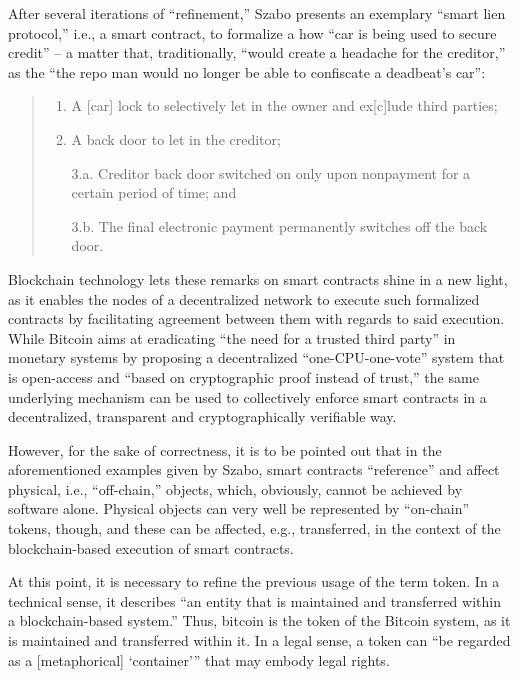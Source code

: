 After several iterations of ``refinement,'' Szabo presents an exemplary ``smart lien protocol,'' i.e., a smart contract, to formalize a how ``car is being used to secure credit'' -- a matter that, traditionally, ``would create a headache for the creditor,'' as the ``the repo man would no longer be able to confiscate a deadbeat's car'': \autocite{uva1997smartcontracts}

\begin{quote}
	\begin{enumerate}
		\item
			A [car] lock to selectively let in the owner and ex[c]lude third parties;
		\item
			A back door to let in the creditor;
		\item[3.a.]
			Creditor back door switched on only upon nonpayment for a certain period of time; and
		\item[3.b.]
			The final electronic payment permanently switches off the back door.
	\end{enumerate}
\end{quote}

Blockchain technology lets these remarks on smart contracts shine in a new light, as it enables the nodes of a decentralized network to execute such formalized contracts by facilitating agreement between them with regards to said execution.
While Bitcoin aims at eradicating ``the need for a trusted third party'' in monetary systems by proposing a decentralized ``one-CPU-one-vote'' system that is open-access and ``based on cryptographic proof instead of trust,'' \autocite[1, 3]{bitcoin2008paper} the same underlying mechanism can be used to collectively enforce smart contracts in a decentralized, transparent and cryptographically verifiable way.

However, for the sake of correctness, it is to be pointed out that in the aforementioned examples given by Szabo, smart contracts ``reference'' \autocite{uva1997smartcontracts} and affect physical, i.e., ``off-chain,'' objects, which, obviously, cannot be achieved by software alone.
Physical objects can very well be represented by ``on-chain'' tokens, though, and these can be affected, e.g., transferred, in the context of the blockchain-based execution of smart contracts.

At this point, it is necessary to refine the previous usage of the term token.
In a technical sense, it describes ``an entity that is maintained and transferred within a blockchain-based system.'' \autocite[15]{github2020blockchaintokens}
Thus, bitcoin is the token of the Bitcoin system, as it is maintained and transferred within it.
In a legal sense, a token can \enquote{be regarded as a [metaphorical] \enquote{container}} that may embody legal rights. \autocites[15]{github2020blockchaintokens}[55, 57]{naegele2019tvtg}

